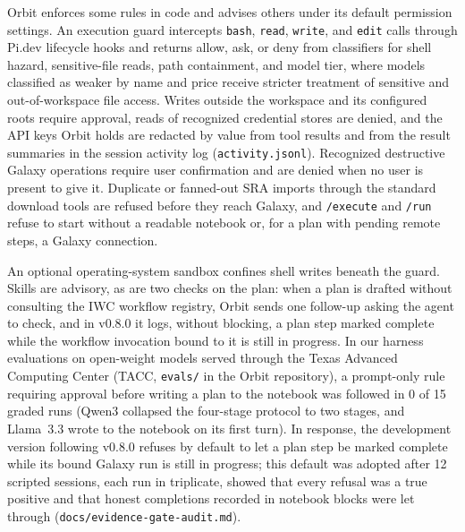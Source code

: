 \documentclass[11pt,letterpaper]{article}
\newcommand{\tool}[1]{\textsf{#1}}
\begin{document}
\tool{Orbit} enforces some rules in code and advises others under its default permission settings. An execution guard intercepts \texttt{bash}, \texttt{read}, \texttt{write}, and \texttt{edit} calls through \tool{Pi.dev} lifecycle hooks and returns allow, ask, or deny from classifiers for shell hazard, sensitive-file reads, path containment, and model tier, where models classified as weaker by name and price receive stricter treatment of sensitive and out-of-workspace file access. Writes outside the workspace and its configured roots require approval, reads of recognized credential stores are denied, and the API keys \tool{Orbit} holds are redacted by value from tool results and from the result summaries in the session activity log (\texttt{activity.jsonl}). Recognized destructive Galaxy operations require user confirmation and are denied when no user is present to give it. Duplicate or fanned-out SRA imports through the standard download tools are refused before they reach Galaxy, and \texttt{/execute} and \texttt{/run} refuse to start without a readable notebook or, for a plan with pending remote steps, a Galaxy connection.

An optional operating-system sandbox confines shell writes beneath the guard. Skills are advisory, as are two checks on the plan: when a plan is drafted without consulting the IWC workflow registry, \tool{Orbit} sends one follow-up asking the agent to check, and in v0.8.0 it logs, without blocking, a plan step marked complete while the workflow invocation bound to it is still in progress. In our harness evaluations on open-weight models served through the Texas Advanced Computing Center (TACC, \texttt{evals/} in the \tool{Orbit} repository), a prompt-only rule requiring approval before writing a plan to the notebook was followed in 0 of 15 graded runs (Qwen3 collapsed the four-stage protocol to two stages, and Llama~3.3 wrote to the notebook on its first turn). In response, the development version following v0.8.0 refuses by default to let a plan step be marked complete while its bound Galaxy run is still in progress; this default was adopted after 12 scripted sessions, each run in triplicate, showed that every refusal was a true positive and that honest completions recorded in notebook blocks were let through (\texttt{docs/evidence-gate-audit.md}).
\end{document}
